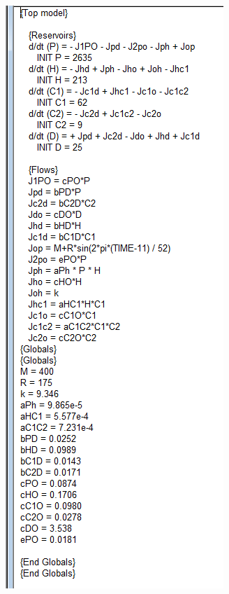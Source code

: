 \documentclass [12pt] {article}
\begin{document}
% 
\includegraphics[scale=0.7]{silver_spring_equation.png}
\end{document}
